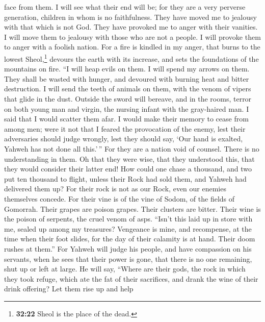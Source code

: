 face from them. I will see what their end will be; for they are a very
perverse generation, children in whom is no faithfulness.
 They have moved me to jealousy with that which is not
God. They have provoked me to anger with their vanities. I will move
them to jealousy with those who are not a people. I will provoke them to
anger with a foolish nation.  For a fire is kindled in my
anger, that burns to the lowest Sheol,\footnote{\textbf{32:22} Sheol is
  the place of the dead.} devours the earth with its increase, and sets
the foundations of the mountains on fire.  ``I will heap
evils on them. I will spend my arrows on them.  They
shall be wasted with hunger, and devoured with burning heat and bitter
destruction. I will send the teeth of animals on them, with the venom of
vipers that glide in the dust.  Outside the sword will
bereave, and in the rooms, terror on both young man and virgin, the
nursing infant with the gray-haired man.  I said that I
would scatter them afar. I would make their memory to cease from among
men;  were it not that I feared the provocation of the
enemy, lest their adversaries should judge wrongly, lest they should
say, `Our hand is exalted, Yahweh has not done all this.'\,''
 For they are a nation void of counsel. There is no
understanding in them.  Oh that they were wise, that they
understood this, that they would consider their latter end!
 How could one chase a thousand, and two put ten thousand
to flight, unless their Rock had sold them, and Yahweh had delivered
them up?  For their rock is not as our Rock, even our
enemies themselves concede.  For their vine is of the
vine of Sodom, of the fields of Gomorrah. Their grapes are poison
grapes. Their clusters are bitter.  Their wine is the
poison of serpents, the cruel venom of asps.  ``Isn't
this laid up in store with me, sealed up among my treasures?
 Vengeance is mine, and recompense, at the time when
their foot slides, for the day of their calamity is at hand. Their doom
rushes at them.''  For Yahweh will judge his people, and
have compassion on his servants, when he sees that their power is gone,
that there is no one remaining, shut up or left at large.
 He will say, ``Where are their gods, the rock in which
they took refuge,  which ate the fat of their sacrifices,
and drank the wine of their drink offering? Let them rise up and help
